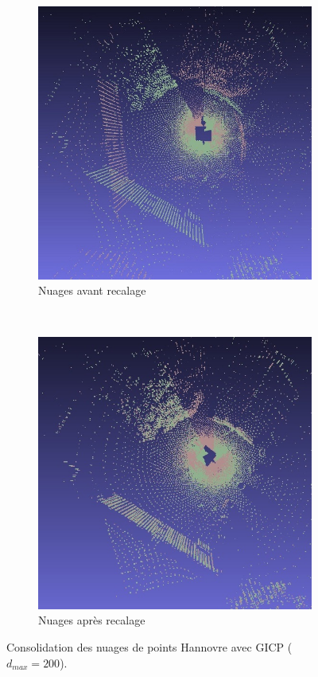 \begin{figure}[H]
   \centering
   \begin{subfigure}[t]{.5\linewidth}
     \centering
     \includegraphics[scale=0.5]{Images/Resultats/hannover_meshlab_before_transformation.jpg}
     \caption{Nuages avant recalage}
   \end{subfigure}%
   ~
   \begin{subfigure}[t]{.5\linewidth}
     \centering
     \includegraphics[scale=0.5]{Images/Resultats/hannover_meshlab_after_transformation.jpg}
     \caption{Nuages après recalage}
   \end{subfigure}
   
   \caption{Consolidation des nuages de points Hannovre avec GICP ($d_{max} = 200$).}
   \label{fig:meshlab}
\end{figure}
   
